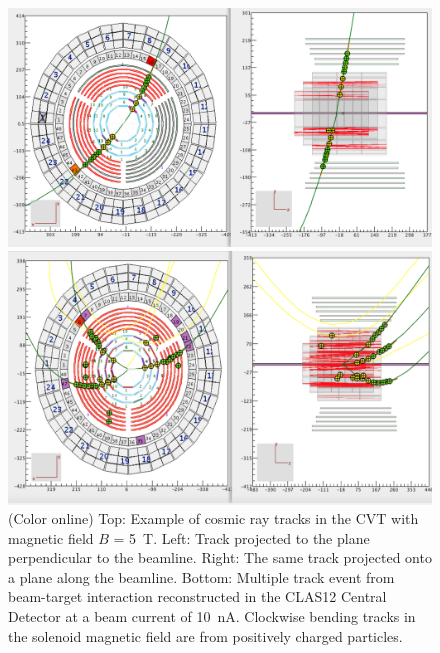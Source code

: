 \documentclass[final,3p,twocolumn]{elsarticle}
\begin{document}
\begin{figure}[th!]
\centerline{\includegraphics[width=1.0\columnwidth]{cvt-cosmic-w-solenoid.png}}
\vspace{-0.5cm}\centerline{\includegraphics[width=1.0\columnwidth]{cvt-3-tracks.png}}
\caption{(Color online) Top: Example of cosmic ray tracks in the CVT with magnetic field $B$ = 5~T. Left: Track projected to
the plane perpendicular to the beamline. Right: The same track projected onto a plane along the beamline. Bottom:
Multiple track event from beam-target interaction reconstructed in the CLAS12 Central Detector at a beam current of 10~nA.
Clockwise bending tracks in the solenoid magnetic field are from positively charged particles.}
\label{cvt-tracks}
\end{figure}
\end{document}
